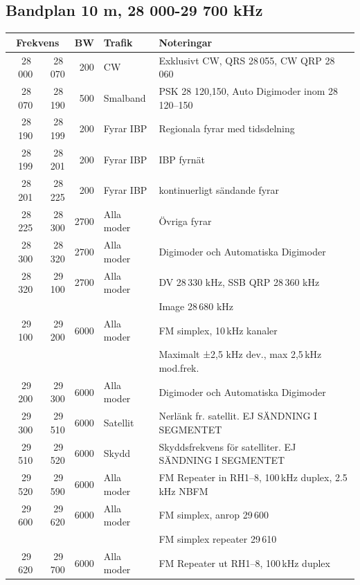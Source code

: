 \small
\subsection*{Bandplan 10 m, 28 000-29 700 kHz}
\begin{tabular}{rrrll}
\multicolumn{2}{c}{\textbf{Frekvens}} & \textbf{BW} & \textbf{Trafik} & \textbf{Noteringar} \\ \hline
28\,000 & 28\,070 & 200  & CW         & Exklusivt CW, QRS 28\,055, CW QRP 28\,060              \\ \hline
28\,070 & 28\,190 & 500  & Smalband   & PSK 28 120,150, Auto Digimoder inom 28\,120--150       \\ \hline
28\,190 & 28\,199 & 200  & Fyrar IBP  & Regionala fyrar med tidsdelning                        \\ \hline
28\,199 & 28\,201 & 200  & Fyrar IBP  & IBP fyrnät                                             \\ \hline
28\,201 & 28\,225 & 200  & Fyrar IBP  & kontinuerligt sändande fyrar                           \\ \hline
28\,225 & 28\,300 & 2700 & Alla moder & Övriga fyrar                                           \\ \hline
28\,300 & 28\,320 & 2700 & Alla moder & Digimoder och Automatiska Digimoder                    \\ \hline
28\,320 & 29\,100 & 2700 & Alla moder & DV 28\,330 kHz, SSB QRP 28\,360 kHz                    \\
        &         &      &            & Image 28\,680 kHz                                      \\ \hline
29\,100 & 29\,200 & 6000 & Alla moder & FM simplex, 10\,kHz kanaler                            \\
        &         &      &            & Maximalt ±2,5 kHz dev., max 2,5\,kHz mod.frek.         \\ \hline
29\,200 & 29\,300 & 6000 & Alla moder & Digimoder och Automatiska Digimoder                    \\ \hline
29\,300 & 29\,510 & 6000 & Satellit   & Nerlänk fr. satellit. EJ SÄNDNING I SEGMENTET          \\ \hline
29\,510 & 29\,520 & 6000 & Skydd      & Skyddsfrekvens för satelliter. EJ SÄNDNING I SEGMENTET \\ \hline
29\,520 & 29\,590 & 6000 & Alla moder & FM Repeater in RH1--8, 100\,kHz duplex, 2.5\,kHz NBFM  \\ \hline
29\,600 & 29\,620 & 6000 & Alla moder & FM simplex, anrop 29\,600                              \\
        &         &      &            & FM simplex repeater 29\,610                            \\ \hline
29\,620 & 29\,700 & 6000 & Alla moder & FM Repeater ut RH1--8, 100\,kHz duplex                 \\ \hline
\end{tabular}
\normalsize
